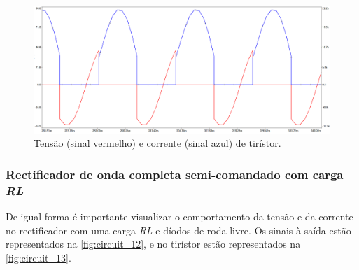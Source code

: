 \documentclass[a4paper,11pt]{article}
\numberwithin{equation}{section}
\begin{document}
\begin{figure}[h]
	\centering
	\includegraphics[keepaspectratio=true, scale=0.4]{img/circuito9}
	\caption{Tensão (sinal vermelho) e corrente (sinal azul) de tirístor.}
	\label{fig:circuit_11}
	\vspace{-0.8em}
\end{figure}

\vspace{12mm}


\subsubsection{Rectificador de onda completa semi-comandado com carga \textit{RL}}

De igual forma é importante visualizar o comportamento da tensão e da corrente no rectificador com uma carga \textit{RL} e díodos de roda livre. Os sinais à saída estão representados na \autoref{fig:circuit_12}, e no tirístor estão representados na \autoref{fig:circuit_13}.
\end{document}
